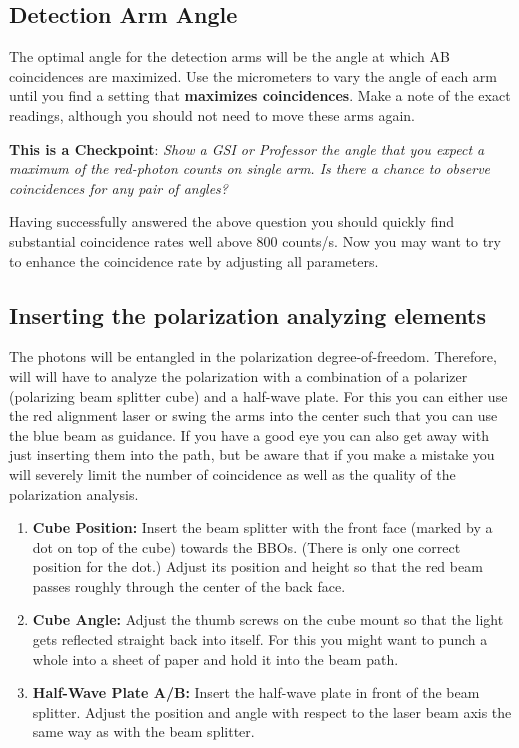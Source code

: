 \documentclass{../lab}
\begin{document}
\subsection{Detection Arm Angle}

The optimal angle for the detection arms will be the angle at which AB coincidences are maximized. Use the micrometers to vary the angle of each arm until you find a setting that \textbf{maximizes coincidences}. Make a note of the exact readings, although you should not need to move these arms again.

\textbf{This is a Checkpoint}: \emph{Show a GSI or Professor the angle that you expect a maximum of the red-photon counts on single arm. Is there a chance to observe coincidences for any pair of angles?}

Having successfully answered the above question you should quickly find substantial coincidence rates well above 800 counts/s. Now you may want to try to enhance the coincidence rate by adjusting all parameters.

\subsection{Inserting the polarization analyzing elements}

The photons will be entangled in the polarization degree-of-freedom. Therefore, will will have to analyze the polarization with a combination of a polarizer (polarizing beam splitter cube) and a half-wave plate. For this you can either use the red alignment laser or swing the arms into the center such that you can use the blue beam as guidance. If you have a good eye you can also get away with just inserting them into the path, but be aware that if you make a mistake you will severely limit the number of coincidence as well as the quality of the polarization analysis.

\begin{enumerate}
    \item \textbf{Cube Position:} Insert the beam splitter with the front face (marked by a dot on top of the cube) towards the BBOs. (There is only one correct position for the dot.) Adjust its position and height so that the red beam passes roughly through the center of the back face.

    \item \textbf{Cube Angle:} Adjust the thumb screws on the cube mount so that the light gets reflected straight back into itself. For this you might want to punch a whole into a sheet of paper and hold it into the beam path.

    \item \textbf{Half-Wave Plate A/B:} Insert the half-wave plate in front of the beam splitter. Adjust the position and angle with respect to the laser beam axis the same way as with the beam splitter.
\end{enumerate}
\end{document}
